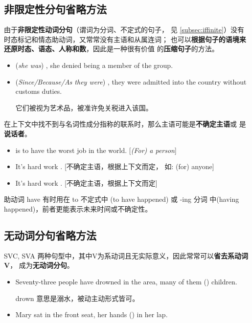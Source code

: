 
\subsection{非限定性分句省略方法}


由于\textbf{非限定性动词分句}（谓词为分词、不定式的句子，
见 \cref{subsec:iffinite}）没有时态标记和情态助动词，又常常没有主语和从属连词；
也可以\textbf{根据句子的语境来还原时态、语态、人称和数}，因此是一种很有价值
的\textbf{压缩句子}的方法。

\begin{itemize}
\item {} (\emph{she was}) , she denied being a member of the group.
\item (\emph{Since/Because/As they were}) , they were
  admitted into the country without customs duties.

  它们被视为艺术品，被准许免关税进入该国。
\end{itemize}

在上下文中找不到与名词性成分指称的联系时，那么主语可能是\textbf{不确定主语}或
是\textbf{说话者}。
\begin{itemize}
\item {} is to have the worst job in the
  world. [\emph{(For) a person}]
\item It's hard work . [不确定主语，根据上下文而定，
  如: (for) anyone]
\item It's hard work . [不确定主语，根据上下文而定]
\end{itemize}

助动词 have 有时用在 to 不定式中 (to have happened) 或 -ing 分词
中(having happened)，前者更能表示未来时间或不确定性。

\subsection{无动词分句省略方法}

SVC, SVA 两种句型中，其中V为系动词且无实际意义，因此常常可以\textbf{省去系动词V}，
成为\textbf{无动词分句}。

\begin{itemize}
\item Seventy-three people have drowned in the area, many of them
  () children.

  drown 意思是溺水，被动主动形式皆可。

\item  Mary sat in the front seat, her hands () in her lap.
\end{itemize}

